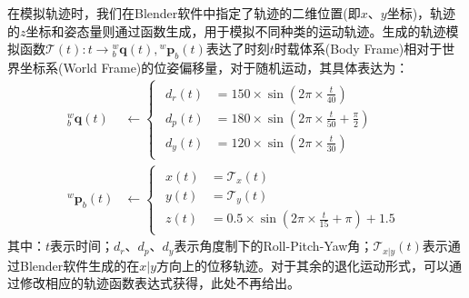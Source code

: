 在模拟轨迹时，我们在Blender软件中指定了轨迹的二维位置(即$x$、$y$坐标)，轨迹的$z$坐标和姿态量则通过函数生成，用于模拟不同种类的运动轨迹。生成的轨迹模拟函数$\mathcal{T}(t):t\to {^{w}_{b}\boldsymbol{q}(t)},{^{w}\boldsymbol{p}_{b}(t)} $表达了时刻$t$时载体系(Body Frame)相对于世界坐标系(World Frame)的位姿偏移量，对于随机运动，其具体表达为：
\begin{equation}
  \begin{aligned}
    {^{w}_{b}\boldsymbol{q}}(t) & \gets\begin{cases}
                                         \begin{aligned}
        d_{r}(t) & =150\times\sin(2\pi\times\frac{t}{40})               \\
        d_{p}(t) & =180\times\sin(2\pi\times\frac{t}{50}+\frac{\pi}{2}) \\
        d_{y}(t) & =120\times\sin(2\pi\times\frac{t}{30})
      \end{aligned}
                                       \end{cases} \\
    {^{w}\boldsymbol{p}_{b}}(t) & \gets\begin{cases}
                                         \begin{aligned}
        x(t) & =\mathcal{T}_x(t)                              \\
        y(t) & =\mathcal{T}_y(t)                              \\
        z(t) & =0.5\times\sin(2\pi\times\frac{t}{15}+\pi)+1.5
      \end{aligned}
                                       \end{cases}
  \end{aligned}
\end{equation}
其中：$t$表示时间；$d_{r}$、$d_{p}$、$d_{y}$表示角度制下的Roll-Pitch-Yaw角；$\mathcal{T}_{x|y}(t)$表示通过Blender软件生成的在$x|y$方向上的位移轨迹。对于其余的退化运动形式，可以通过修改相应的轨迹函数表达式获得，此处不再给出。
